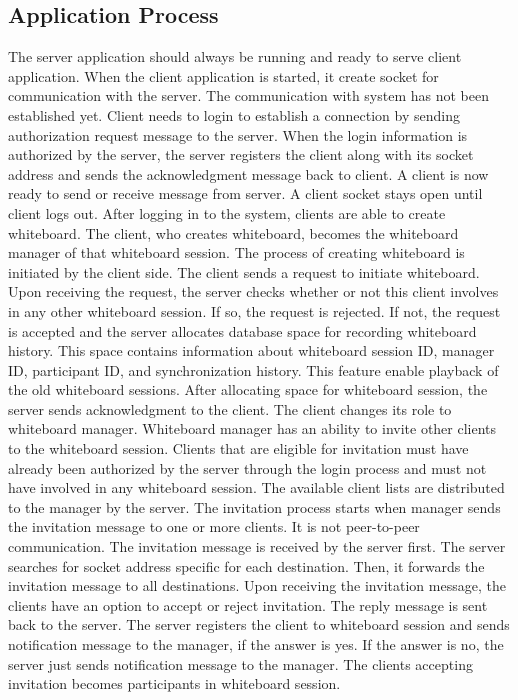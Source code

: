 \documentclass[conference]{IEEEtran}
\begin{document}
\subsection{Application Process}
The server application should always be running and ready to serve client application. When the client application is started, it create socket for communication with the server. The communication with system has not been established yet.  Client needs to login to establish a connection by sending authorization request message to the server. When the login information is authorized by the server, the server registers the client along with its socket address and sends the acknowledgment message back to client. A client is now ready to send or receive message from server. A client socket stays open until client logs out.
After logging in to the system, clients are able to create whiteboard. The client, who creates whiteboard, becomes the whiteboard manager of that whiteboard session. The process of creating whiteboard is initiated by the client side. The client sends a request to initiate whiteboard. Upon receiving the request, the server checks whether or not this client involves in any other whiteboard session. If so, the request is rejected. If not, the request is accepted and the server allocates database space for recording whiteboard history. This space contains information about whiteboard session ID, manager ID, participant ID, and synchronization history. This feature enable playback of the old whiteboard sessions. After allocating space for whiteboard session, the server sends acknowledgment to the client. The client changes its role to whiteboard manager.
Whiteboard manager has an ability to invite other clients to the whiteboard session. Clients that are eligible for invitation must have already been authorized by the server through the login process and must not have involved in any whiteboard session. The available client lists are distributed to the manager by the server. The invitation process starts when manager sends the invitation message to one or more clients. It is not peer-to-peer communication. The invitation message is received by the server first. The server searches for socket address specific for each destination. Then, it forwards the invitation message to all destinations. Upon receiving the invitation message, the clients have an option to accept or reject invitation. The reply message is sent back to the server. The server registers the client to whiteboard session and sends notification message to the manager, if the answer is yes. If the answer is no, the server just sends notification message to the manager. The clients accepting invitation becomes participants in whiteboard session.
\end{document}
